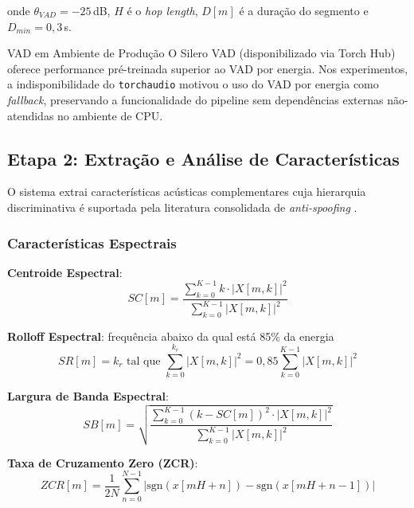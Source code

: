 \documentclass[12pt,a4paper]{article}
\begin{document}
onde $\theta_{VAD} = -25$\,dB, $H$ \'{e} o \textit{hop length}, $D[m]$ \'{e}
a dura\c{c}\~{a}o do segmento e $D_{min} = 0{,}3$\,s.

\begin{infobox}{VAD em Ambiente de Produ\c{c}\~{a}o}
O Silero VAD (disponibilizado via Torch Hub) oferece performance pr\'{e}-treinada
superior ao VAD por energia. Nos experimentos, a indisponibilidade do
\texttt{torchaudio} motivou o uso do VAD por energia como \textit{fallback},
preservando a funcionalidade do pipeline sem depend\^{e}ncias externas
n\~{a}o-atendidas no ambiente de CPU.
\end{infobox}

\subsection{Etapa 2: Extra\c{c}\~{a}o e An\'{a}lise de Caracter\'{i}sticas}

O sistema extrai caracter\'{i}sticas ac\'{u}sticas complementares cuja
hierarquia discriminativa \'{e} suportada pela literatura consolidada de
\textit{anti-spoofing} \cite{sahidullah2015comparison, todisco2016new,
todisco2019asvspoof}.

\subsubsection{Caracter\'{i}sticas Espectrais}

\textbf{Centroide Espectral}:
\begin{equation}
SC[m] = \frac{\displaystyle\sum_{k=0}^{K-1} k\cdot|X[m,k]|^2}
             {\displaystyle\sum_{k=0}^{K-1}|X[m,k]|^2}
\end{equation}

\textbf{Rolloff Espectral}: frequ\^{e}ncia abaixo da qual est\'{a} 85\% da
energia
\begin{equation}
SR[m] = k_r \text{ tal que }
\sum_{k=0}^{k_r}|X[m,k]|^2 = 0{,}85\sum_{k=0}^{K-1}|X[m,k]|^2
\end{equation}

\textbf{Largura de Banda Espectral}:
\begin{equation}
SB[m] =
\sqrt{\frac{\displaystyle\sum_{k=0}^{K-1}(k-SC[m])^2\cdot|X[m,k]|^2}
           {\displaystyle\sum_{k=0}^{K-1}|X[m,k]|^2}}
\end{equation}

\textbf{Taxa de Cruzamento Zero (ZCR)}:
\begin{equation}
ZCR[m] = \frac{1}{2N}\sum_{n=0}^{N-1}
|\mathrm{sgn}(x[mH+n]) - \mathrm{sgn}(x[mH+n-1])|
\end{equation}
\end{document}
